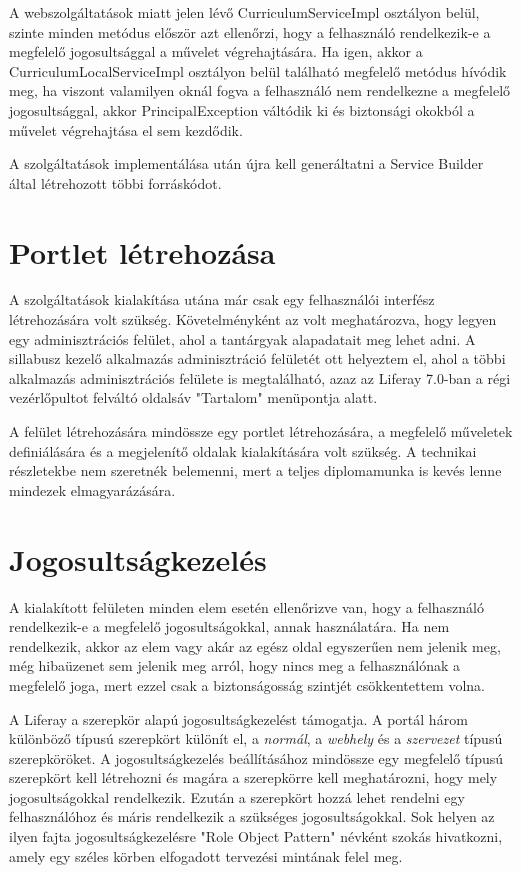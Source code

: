 \documentclass[hidelinks, 12pt, a4paper]{report}
\begin{document}
A webszolgáltatások miatt jelen lévő CurriculumServiceImpl osztályon belül, szinte minden metódus először azt ellenőrzi, hogy a felhasználó rendelkezik-e a megfelelő jogosultsággal a művelet végrehajtására. Ha igen, akkor a CurriculumLocalServiceImpl osztályon belül található megfelelő metódus hívódik meg, ha viszont valamilyen oknál fogva a felhasználó nem rendelkezne a megfelelő jogosultsággal, akkor PrincipalException váltódik ki és biztonsági okokból a művelet végrehajtása el sem kezdődik.

A szolgáltatások implementálása után újra kell generáltatni a Service Builder által létrehozott többi forráskódot.

\section{Portlet létrehozása}

A szolgáltatások kialakítása utána már csak egy felhasználói interfész létrehozására volt szükség. Követelményként az volt meghatározva, hogy legyen egy adminisztrációs felület, ahol a tantárgyak alapadatait meg lehet adni. A sillabusz kezelő alkalmazás adminisztráció felületét ott helyeztem el, ahol a többi alkalmazás adminisztrációs felülete is megtalálható, azaz az Liferay 7.0-ban a régi vezérlőpultot felváltó oldalsáv "Tartalom" menüpontja alatt.

A felület létrehozására mindössze egy portlet létrehozására, a megfelelő műveletek definiálására és a megjelenítő oldalak kialakítására volt szükség. A technikai részletekbe nem szeretnék belemenni, mert a teljes diplomamunka is kevés lenne mindezek elmagyarázására.

\section{Jogosultságkezelés}

A kialakított felületen minden elem esetén ellenőrizve van, hogy a felhasználó rendelkezik-e a megfelelő jogosultságokkal, annak használatára. Ha nem rendelkezik, akkor az elem vagy akár az egész oldal egyszerűen nem jelenik meg, még hibaüzenet sem jelenik meg arról, hogy nincs meg a felhasználónak a megfelelő joga, mert ezzel csak a biztonságosság szintjét csökkentettem volna.

A Liferay a szerepkör alapú jogosultságkezelést támogatja. A portál három különböző típusú szerepkört különít el, a \emph{normál}, a \emph{webhely} és a \emph{szervezet} típusú szerepköröket. A jogosultságkezelés beállításához mindössze egy megfelelő típusú szerepkört kell létrehozni és magára a szerepkörre kell meghatározni, hogy mely jogosultságokkal rendelkezik. Ezután a szerepkört hozzá lehet rendelni egy felhasználóhoz és máris rendelkezik a szükséges jogosultságokkal. Sok helyen az ilyen fajta jogosultságkezelésre "Role Object Pattern" névként szokás hivatkozni, amely egy széles körben elfogadott tervezési mintának felel meg.
\end{document}
